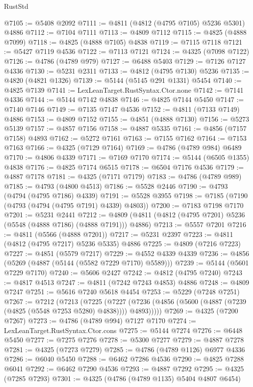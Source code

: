 \begin{lexlean}{RustStd}
\begin{coremodule}
{\begin{coremodule}
{{{{{{{{{{{{{{{{{{{{{{{{{{{{{{{{{{{{{{{{{{{{{{{{{{{{{{{{{{{{{{{{{{{{{{{{{{{{{{{{@7105 := @5408 @2092
@7111 := @4811 (@4812 (@4795 @7105) @5236 @5301) @4886
@7112 := @7104 @7111
@7113 := @4809 @7112
@7115 := @4825 (@4888 @7099)
@7118 := @4825 (@4888 @7105) @4838
@7119 := @7115 @7118
@7121 := @5427 @7119 @4536
@7122 := @7113 @7121
@7124 := @4325 (@7098 @7122)
@7126 := @4786 (@4789 @979)
@7127 := @6488 @5403
@7129 := @7126 @7127 @4336
@7130 := @5231 @2311
@7133 := @4812 (@4795 @7130) @5236
@7135 := @4820 (@4821 @1326)
@7139 := @5144 (@5145 @291 @1331) @5454
@7140 := @4825 @7139
@7141 := LexLeanTarget.RustSyntax.Ctor.none
@7142 := @7141 @4336
@7144 := @5144 @7142 @4838
@7146 := @4825 @7144 @5450
@7147 := @7140 @7146
@7149 := @7135 @7147 @4536
@7152 := @4811 (@7133 @7149) @4886
@7153 := @4809 @7152
@7155 := @4851 (@4888 @7130)
@7156 := @5273 @5139
@7157 := @4857 @7156
@7158 := @4887 @5335
@7161 := @4856 (@7157 @7158) @4893
@7162 := @5272 @7161
@7163 := @7155 @7162
@7164 := @7153 @7163
@7166 := @4325 (@7129 @7164)
@7169 := @4786 (@4789 @984) @6489
@7170 := @4806 @4339
@7171 := @7169 @7170
@7174 := @5144 (@6505 @1355) @4838
@7176 := @4825 @7174 @6515
@7178 := @6504 @7176 @4536
@7179 := @4887 @7178
@7181 := @4325 (@7171 @7179)
@7183 := @4786 (@4789 @989)
@7185 := @4793 (@4800 @4513)
@7186 := @5528 @2446
@7190 := @4793 (@4794 (@4795 @7186) @4339)
@7191 := @5528 @3955
@7198 := @7185 (@7190 (@4793 (@4794 (@4795 @7191) @4339) @4803))
@7200 := @7183 @7198 @7170
@7201 := @5231 @2441
@7212 := @4809 (@4811 (@4812 (@4795 @7201) @5236 (@5548 (@4888 @7186) (@4888 @7191))) @4886)
@7213 := @5557 @7201
@7216 := @4811 (@5566 (@4888 @7201))
@7217 := @5231 @2397
@7223 := @4811 (@4812 (@4795 @7217) @5236 @5335) @4886
@7225 := @4809 (@7216 @7223)
@7227 := @4851 (@5579 @7217)
@7229 := @4552 @4339 @4339
@7236 := @4856 (@5269 (@4887 (@5144 (@5582 @7229 @7170) @5589)))
@7239 := @5144 (@5601 @7229 @7170)
@7240 := @5606 @2427
@7242 := @4812 (@4795 @7240)
@7243 := @4817 @4513
@7247 := @4811 (@7242 @7243 @4853) @4886
@7248 := @4809 @7247
@7251 := @5616 @7240 @5618 @4454
@7253 := @5229 (@7248 @7251)
@7267 := @7212
    (@7213
      (@7225
        (@7227 (@7236 (@4856 (@5600 (@4887 (@7239 (@4825 (@5548 @7253 @5280) @4838)))) @4893)))))
@7269 := @4325 (@7200 @7267)
@7273 := @4786 (@4789 @994) @7127 @7170
@7274 := LexLeanTarget.RustSyntax.Ctor.cons
@7275 := @5144 @7274
@7276 := @6448 @5450
@7277 := @7275 @7276
@7278 := @5300 @7277
@7279 := @4887 @7278
@7281 := @4325 (@7273 @7279)
@7285 := @4786 (@4789 @1126) @6977 @4336
@7286 := @6040 @5450
@7288 := @6462 @7286 @4536
@7290 := @4825 @7288 @6041
@7292 := @6462 @7290 @4536
@7293 := @4887 @7292
@7295 := @4325 (@7285 @7293)
@7301 := @4325 (@4786 (@4789 @1135) @5404 @4807 @6454)
}}}}}}}}}}}}}}}}}}}}}}}}}}}}}}}}}}}}}}}}}}}}}}}}}}}}}}}}}}}}}}}}}}}}}}}}}}}}}}}}
\end{coremodule}}
\end{coremodule}
\end{lexlean}
